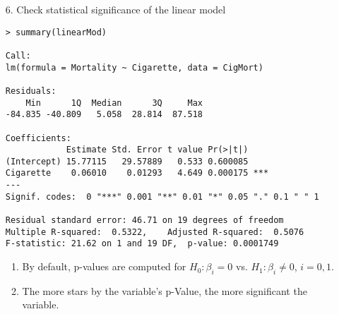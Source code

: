 \begin{frame}[fragile]

	\begin{enumerate}
		\item[6.] Check statistical significance of the linear model
			\vfill
			\begin{center}
				\begin{minipage}{0.7\textwidth}
\begin{lstlisting}
> summary(linearMod)

Call:
lm(formula = Mortality ~ Cigarette, data = CigMort)

Residuals:
    Min      1Q  Median      3Q     Max
-84.835 -40.809   5.058  28.814  87.518

Coefficients:
            Estimate Std. Error t value Pr(>|t|)
(Intercept) 15.77115   29.57889   0.533 0.600085
Cigarette    0.06010    0.01293   4.649 0.000175 ***
---
Signif. codes:  0 "***" 0.001 "**" 0.01 "*" 0.05 "." 0.1 " " 1

Residual standard error: 46.71 on 19 degrees of freedom
Multiple R-squared:  0.5322,	Adjusted R-squared:  0.5076
F-statistic: 21.62 on 1 and 19 DF,  p-value: 0.0001749
\end{lstlisting}
				\end{minipage}
\end{center}
\vfill
\begin{enumerate}
\item By default, p-values are computed for $H_0: \beta_i=0$ vs. $H_1:\beta_i\ne 0$, $i=0,1$.
\item The more stars by the variable's p-Value, the more significant the variable.
\end{enumerate}
	\end{enumerate}
\end{frame}
